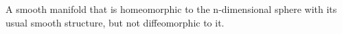 A smooth manifold that is
homeomorphic to the n-dimensional sphere with its usual smooth structure,
but not diffeomorphic to it.